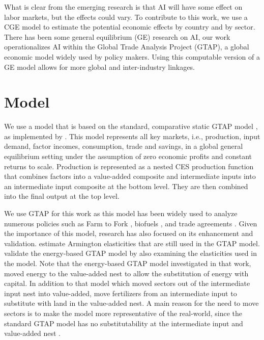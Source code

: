 \documentclass[
  authoryear,
  doubleblind]{elsarticle}
\begin{document}
What is clear from the emerging research is that AI will have some
effect on labor markets, but the effects could vary. To contribute to
this work, we use a CGE model to estimate the potential economic effects
by country and by sector. There has been some general equilibrium (GE)
research on AI, our work operationalizes AI within the Global Trade
Analysis Project (GTAP), a global economic model widely used by policy
makers. Using this computable version of a GE model allows for more
global and inter-industry linkages.

\section{Model}\label{model}

We use a model that is based on the standard, comparative static GTAP
model \citep{hertel1997structure}, as implemented by \citet{ivanic2025}.
This model represents all key markets, i.e., production, input demand,
factor incomes, consumption, trade and savings, in a global general
equilibrium setting under the assumption of zero economic profits and
constant returns to scale. Production is represented as a nested CES
production function that combines factors into a value-added composite
and intermediate inputs into an intermediate input composite at the
bottom level. They are then combined into the final output at the top
level.

We use GTAP for this work as this model has been widely used to analyze
numerous policies such as Farm to Fork \citep{beckman2021, beckman2022},
biofuels \citep{taheripour2010}, and trade agreements
\citep{beckman2023}. Given the importance of this model, research has
also focused on its enhancement and validation. \citet{hertel2007}
estimate Armington elasticities that are still used in the GTAP model.
\citet{beckman2011} validate the energy-based GTAP model by also
examining the elasticities used in the model. Note that the energy-based
GTAP model investigated in that work, moved energy to the value-added
nest to allow the substitution of energy with capital. In addition to
that model which moved sectors out of the intermediate input nest into
value-added, \citet{bartelings2016} move fertilizers from an
intermediate input to substitute with land in the value-added nest. A
main reason for the need to move sectors is to make the model more
representative of the real-world, since the standard GTAP model has no
substitutability at the intermediate input and value-added nest
\citep{ivanic2023}.
\end{document}
